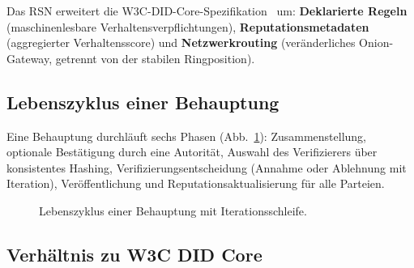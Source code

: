 \documentclass[11pt,a4paper,twocolumn]{article}
\begin{document}
Das RSN erweitert die W3C-DID-Core-Spezifikation~\cite{did2022} um: \textbf{Deklarierte Regeln} (maschinenlesbare Verhaltensverpflichtungen), \textbf{Reputationsmetadaten} (aggregierter Verhaltensscore) und \textbf{Netzwerkrouting} (veränderliches Onion-Gateway, getrennt von der stabilen Ringposition).

\subsection{Lebenszyklus einer Behauptung}

Eine Behauptung durchläuft sechs Phasen (Abb.~\ref{fig:lifecycle}): Zusammenstellung, optionale Bestätigung durch eine Autorität, Auswahl des Verifizierers über konsistentes Hashing, Verifizierungsentscheidung (Annahme oder Ablehnung mit Iteration), Veröffentlichung und Reputationsaktualisierung für alle Parteien.

\begin{figure}[ht]
\centering
{}
\caption{Lebenszyklus einer Behauptung mit Iterationsschleife.}
\label{fig:lifecycle}
\end{figure}

\subsection{Verhältnis zu W3C DID Core}
\end{document}
